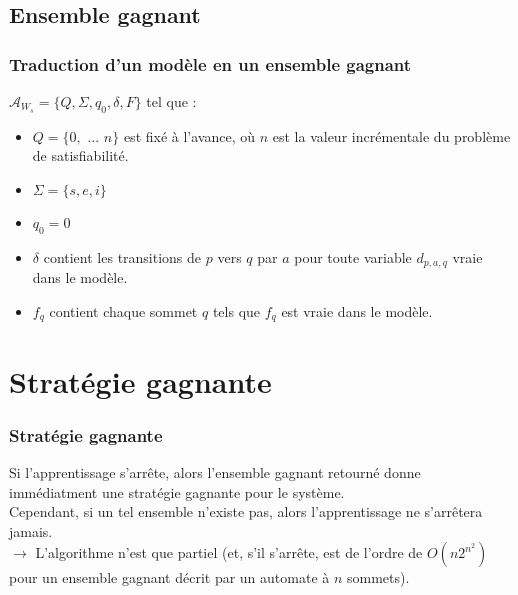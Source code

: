 \documentclass{beamer}
\begin{document}
\subsection{Ensemble gagnant}
\begin{frame}
\frametitle{Traduction d'un modèle en un ensemble gagnant}
$\mathcal{A}_{W_s}=\{Q,\Sigma,q_0,\delta,F\}$ tel que :
\begin{itemize}
\item $Q=\{0,$ $...$ $n\}$ est fixé à l'avance, où $n$ est la valeur incrémentale du problème de satisfiabilité.
\item $\Sigma=\{s,e,i\}$ 
\item $q_0=0$
\item $\delta$ contient les transitions de $p$ vers $q$ par $a$ pour toute variable $d_{p,a,q}$ vraie dans le modèle.
\item $f_q$ contient chaque sommet $q$ tels que $f_q$ est vraie dans le modèle.
\end{itemize}
\end{frame}

\section{Stratégie gagnante}
\begin{frame}
\frametitle{Stratégie gagnante}
Si l'apprentissage s'arrête, alors l'ensemble gagnant retourné donne immédiatment une stratégie gagnante pour le système.\\[3mm]
Cependant, si un tel ensemble n'existe pas, alors l'apprentissage ne s'arrêtera jamais.\\[6mm]
$\rightarrow$ L'algorithme n'est que partiel (et, s'il s'arrête, est de l'ordre de \alert{$O(n2^{n^2})$} pour un ensemble gagnant décrit par un automate à $n$ sommets).
\end{frame}
\end{document}
